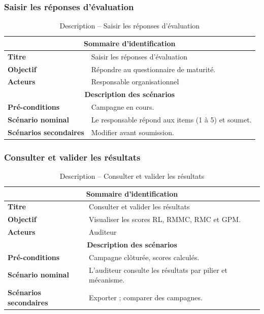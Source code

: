 \subsubsection{Saisir les réponses d'évaluation}
\begin{table}[H]
\centering
\renewcommand{\arraystretch}{1.3}
\begin{tabular}{@{}p{}p{}@{}}
\hline
\multicolumn{2}{c}{\textbf{Sommaire d'identification}} \\
\hline
\textbf{Titre} & Saisir les réponses d'évaluation \\
\textbf{Objectif} & Répondre au questionnaire de maturité. \\
\textbf{Acteurs} & Responsable organisationnel \\
\hline
\multicolumn{2}{c}{\textbf{Description des scénarios}} \\
\hline
\textbf{Pré-conditions} & Campagne en cours. \\
\textbf{Scénario nominal} & Le responsable répond aux items (1 à 5) et soumet. \\
\textbf{Scénarios secondaires} & Modifier avant soumission. \\
\hline
\end{tabular}
\caption{Description -- Saisir les réponses d'évaluation}
\end{table}

\subsubsection{Consulter et valider les résultats}
\begin{table}[H]
\centering
\renewcommand{\arraystretch}{1.3}
\begin{tabular}{@{}p{}p{}@{}}
\hline
\multicolumn{2}{c}{\textbf{Sommaire d'identification}} \\
\hline
\textbf{Titre} & Consulter et valider les résultats \\
\textbf{Objectif} & Visualiser les scores RL, RMMC, RMC et GPM. \\
\textbf{Acteurs} & Auditeur \\
\hline
\multicolumn{2}{c}{\textbf{Description des scénarios}} \\
\hline
\textbf{Pré-conditions} & Campagne clôturée, scores calculés. \\
\textbf{Scénario nominal} & L'auditeur consulte les résultats par pilier et mécanisme. \\
\textbf{Scénarios secondaires} & Exporter ; comparer des campagnes. \\
\hline
\end{tabular}
\caption{Description -- Consulter et valider les résultats}
\end{table}

